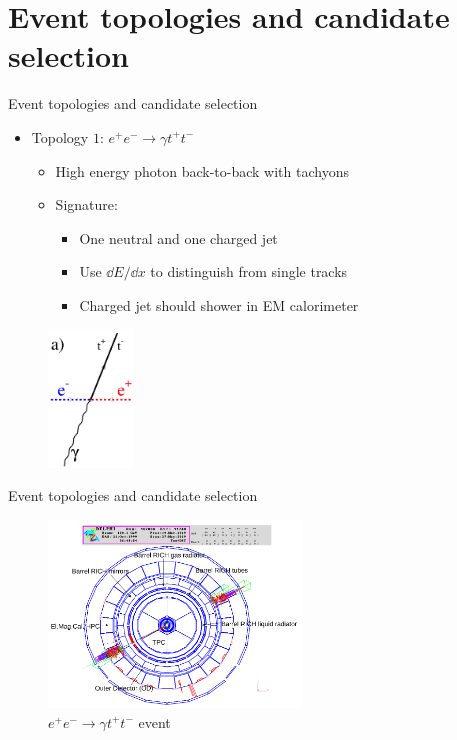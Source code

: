 \documentclass{beamer}
\begin{document}
\section{Event topologies and candidate selection}
\begin{frame}{Event topologies and candidate selection}
  \begin{itemize}
    \item{Topology $1$: $e^+e^-\to\gamma t^+t^-$}
    \begin{itemize}
      \item{High energy photon back-to-back with tachyons}
      \item{Signature:}
      \begin{itemize}
        \item{One neutral and one charged jet}
        \item{Use $\dd{E}/\dd{x}$ to distinguish from single tracks}
        \item{Charged jet should shower in EM calorimeter}
      \end{itemize}
    \end{itemize}
  \end{itemize}
  \begin{figure}
    \centering
    \includegraphics[width = 0.2\textwidth]{TopologyA.png}
  \end{figure}
\end{frame}

\begin{frame}{Event topologies and candidate selection}
  \begin{figure}
    \centering
    \includegraphics[width = 0.6\textwidth]{Topology1.png}
    \caption{$e^+e^-\to \gamma t^+t^-$ event}
  \end{figure}
\end{frame}
\end{document}
